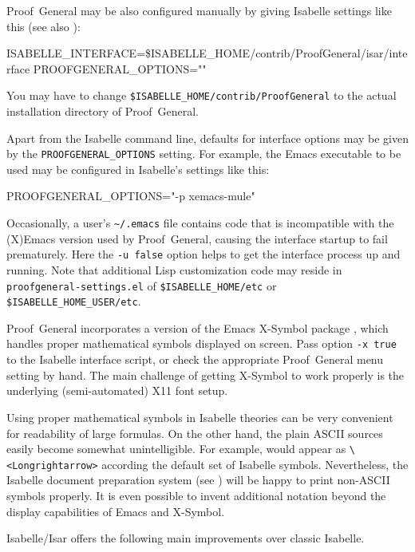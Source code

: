 \begin{isabellebody}
\begin{isamarkuptext}
  \medskip Proof~General may be also configured manually by giving
  Isabelle settings like this (see also \cite{isabelle-sys}):

\begin{ttbox}
ISABELLE_INTERFACE=\$ISABELLE_HOME/contrib/ProofGeneral/isar/interface
PROOFGENERAL_OPTIONS=""
\end{ttbox}
  You may have to change \verb|$ISABELLE_HOME/contrib/ProofGeneral| to the actual installation
  directory of Proof~General.

  \medskip Apart from the Isabelle command line, defaults for
  interface options may be given by the \verb|PROOFGENERAL_OPTIONS|
  setting.  For example, the Emacs executable to be used may be
  configured in Isabelle's settings like this:
\begin{ttbox}
PROOFGENERAL_OPTIONS="-p xemacs-mule"  
\end{ttbox}

  Occasionally, a user's \verb|~/.emacs| file contains code
  that is incompatible with the (X)Emacs version used by
  Proof~General, causing the interface startup to fail prematurely.
  Here the \verb|-u false| option helps to get the interface
  process up and running.  Note that additional Lisp customization
  code may reside in \verb|proofgeneral-settings.el| of
  \verb|$ISABELLE_HOME/etc| or \verb|$ISABELLE_HOME_USER/etc|.%
\end{isamarkuptext}%
\isamarkuptrue%
%
\isamarkuptrue%
%
\begin{isamarkuptext}%
Proof~General incorporates a version of the Emacs X-Symbol package
  \cite{x-symbol}, which handles proper mathematical symbols displayed
  on screen.  Pass option \verb|-x true| to the Isabelle
  interface script, or check the appropriate Proof~General menu
  setting by hand.  The main challenge of getting X-Symbol to work
  properly is the underlying (semi-automated) X11 font setup.

  \medskip Using proper mathematical symbols in Isabelle theories can
  be very convenient for readability of large formulas.  On the other
  hand, the plain ASCII sources easily become somewhat unintelligible.
  For example, \isa{{\isachardoublequote}{\isasymLongrightarrow}{\isachardoublequote}} would appear as \verb|\<Longrightarrow>| according
  the default set of Isabelle symbols.  Nevertheless, the Isabelle
  document preparation system (see ) will be
  happy to print non-ASCII symbols properly.  It is even possible to
  invent additional notation beyond the display capabilities of Emacs
  and X-Symbol.%
\end{isamarkuptext}%
\isamarkuptrue%
%
\isamarkuptrue%
%
\begin{isamarkuptext}%
Isabelle/Isar offers the following main improvements over classic
  Isabelle.


\end{isamarkuptext}
\end{isabellebody}
